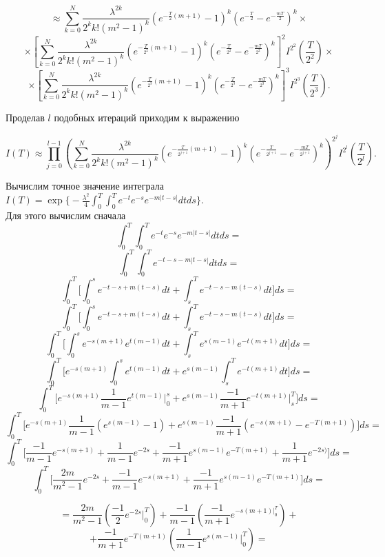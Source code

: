 \documentclass [12pt]{report}
\begin{document}
$$
 \approx \sum_{k=0}^{N} \frac{\lambda^{2k}} {2^k k! (m^2 - 1)^k}
(e^{-\frac{T}{2}(m+1)} - 1)^k (e^{-\frac{T}{2}} - e^{-\frac{mT}{2}})^k \times
$$
$$
\times[ \sum_{k=0}^{N} \frac{\lambda^{2k}} {2^k k! (m^2 - 1)^k}
(e^{-\frac{T}{2^2}(m+1)} - 1)^k (e^{-\frac{T}{2^2}} - e^{-\frac{mT}{2^2}})^k
]^2 I^{2^2}(\frac{T}{2^2}) \times
$$
$$
\times [ \sum_{k=0}^{N} \frac{\lambda^{2k}} {2^k k! (m^2 - 1)^k}
(e^{-\frac{T}{2^3}(m+1)} - 1)^k (e^{-\frac{T}{2^3}} - e^{-\frac{mT}{2^3}})^k
]^3 I^{2^3}(\frac{T}{2^3}).
$$

\vspace{1cm}

\noindent Проделав $l$ подобных итераций приходим к выражению

\begin{equation}\label{eq:5}
I(T)\approx \prod_{j=0}^{l-1}(
\sum_{k=0}^{N}\frac{\lambda^{2k}}{2^k k!(m^2 - 1)^{k}}
(e^{-\frac{T}{2^{j+1}}(m+1)} - 1)^k
(e^{-\frac{T}{2^{j+1}}} - e^{-\frac{mT}{2^{j+1}}})^k
)^{2^j} I^{2^l}(\frac{T}{2^l}).
\end{equation}


Вычислим точное значение интеграла $ I(T) = \exp\Big\{-\frac{\lambda^2}{4}
\int_{0}^{T}\int_{0}^{T} e^{-t} e^{-s} e^{-m|t-s|}dtds\Big\}.$ \\
Для этого вычислим сначала
$$
\int_{0}^{T}\int_{0}^{T} e^{-t} e^{-s} e^{-m|t-s|}dtds =
$$
$$
\int_{0}^{T}\int_{0}^{T} e^{-t -s -m|t-s|}dtds =
$$
$$
\int_{0}^{T} \Big[
\int_{0}^{s} e^{-t -s + m(t-s)}dt + \int_{s}^{T} e^{-t -s -m(t-s)}dt
\Big ]ds =
$$
$$
\int_{0}^{T} \Big[
\int_{0}^{s} e^{-t -s + m(t-s)}dt + \int_{s}^{T} e^{-t -s -m(t-s)}dt
\Big ]ds =
$$
$$
\int_{0}^{T} \Big[
\int_{0}^{s} e^{-s(m+1)} e^{t(m-1)} dt + \int_{s}^{T} e^{s(m-1)} e^{-t(m+1)} dt
\Big ]ds =
$$
$$
\int_{0}^{T} \Big[
e^{-s(m+1)} \int_{0}^{s} e^{t(m-1)} dt +  e^{s(m-1)} \int_{s}^{T} e^{-t(m+1)} dt
\Big ]ds =
$$
$$
\int_{0}^{T} \Big[
e^{-s(m+1)} \frac{1}{m-1} e^{t(m-1)} \Big|_{0}^s +
e^{s(m-1)} \frac{-1}{m+1}e^{-t(m+1)} \Big|_{s}^{T}
\Big ]ds =
$$
$$
\int_{0}^{T} \Big[
e^{-s(m+1)} \frac{1}{m-1} (e^{s(m-1)} - 1) +
e^{s(m-1)} \frac{-1}{m+1} (e^{-s(m+1)} - e^{-T(m+1)})
\Big ]ds =
$$
$$
\int_{0}^{T} \Big[
\frac{-1}{m-1} e^{-s(m+1)} + \frac{1}{m-1} e^{-2s} +
\frac{-1}{m+1} e^{s(m-1)} e^{-T(m+1)} + \frac{1}{m+1} e^{-2s)}
\Big ]ds =
$$
$$
\int_{0}^{T} \Big[
\frac{2m}{m^2-1} e^{-2s} +\frac{-1}{m-1} e^{-s(m+1)} +
\frac{-1}{m+1} e^{s(m-1)} e^{-T(m+1)}
\Big ]ds =
$$

$$
= \frac{2m}{m^2-1} (\frac{-1}{2} e^{-2s} \Big|_{0}^{T}) +
\frac{-1}{m-1}( \frac{-1}{m+1} e^{-s(m+1) \Big|_{0}^{T}}) +
$$
$$
+ \frac{-1}{m+1} e^{-T(m+1)} (\frac{1}{m-1} e^{s(m-1)} \Big|_{0}^{T}) =
$$
\end{document}

